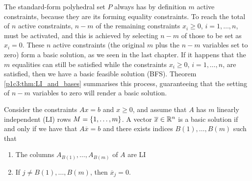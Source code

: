 The standard-form polyhedral set $P$ always has by definition $m$ active constraints, because they are its forming equality constraints. To reach the total of $n$ active constraints, $n-m$ of the remaining constraints $x_i \ge 0$, $i =1,\dots, n$, must be activated, and this is achieved by selecting $n-m$ of those to be set as $x_i = 0$. These $n$ active constraints (the original $m$ plus the $n-m$ variables set to zero) form a basic solution, as we seen in the last chapter. If it happens that the $m$ equalities can still be satisfied while the constraints $x_i \ge 0$, $i =1,\dots, n$, are satisfied, then we have a basic feasible solution (BFS). Theorem \ref{p1c3:thm:LI_and_bases} summarises this process, guaranteeing that the setting of $n-m$ variables to zero will render a basic solution.

\begin{theorem} \label{p1c3:thm:LI_and_bases}
	Consider the constraints $Ax = b$ and $x \geq 0$, and assume that $A$ has $m$ linearly independent (LI) rows $M = \left\{ 1,\dots,m \right \}$. A vector $\overline{x} \in \mathbb{R}^n$ is a basic solution if and only if we have that $A \overline{x} = b$ and there exists indices $B(1), \dots, B(m)$ such that
	\begin{enumerate}
		\item The columns $A_{B(1)}, \dots, A_{B(m)}$ of $A$ are LI
		\item If $j \neq B(1), \dots, B(m)$, then $\overline{x}_j = 0$.
	\end{enumerate} 
\end{theorem}

